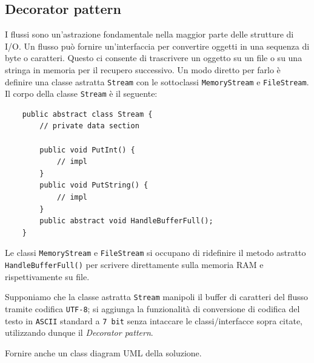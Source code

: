 \documentclass[12pt,a4paper]{article}
\begin{document}
    \subsection{Decorator pattern}
    \begin{Exercise}[origin={Ispirato ad un esempio del libro GoF}]
        I flussi sono un'astrazione fondamentale nella maggior parte delle strutture di I/O. Un flusso può fornire un'interfaccia per convertire oggetti in una sequenza di byte o caratteri. Questo ci consente di trascrivere un oggetto su un file o su una stringa in memoria per il recupero successivo. Un modo diretto per farlo è definire una classe astratta \texttt{Stream} con le sottoclassi \texttt{MemoryStream} e \texttt{FileStream}.
        Il corpo della classe \texttt{Stream} è il seguente:
        \begin{lstlisting}
    public abstract class Stream {
        // private data section
        
        public void PutInt() {
            // impl
        }
        public void PutString() {
            // impl
        }
        public abstract void HandleBufferFull();
    }
        \end{lstlisting}
        Le classi \texttt{MemoryStream} e \texttt{FileStream} si occupano di ridefinire il metodo astratto \texttt{HandleBufferFull()} per scrivere direttamente sulla memoria RAM e rispettivamente su file.
        
        Supponiamo che la classe astratta \texttt{Stream} manipoli il buffer di caratteri del flusso tramite codifica \texttt{UTF-8}; si aggiunga la funzionalità di conversione di codifica del testo in \texttt{ASCII} standard a \texttt{7 bit} senza intaccare le classi/interfacce sopra citate, utilizzando dunque il \textit{Decorator pattern}.

        Fornire anche un class diagram UML della soluzione.
    \end{Exercise}

\end{document}

